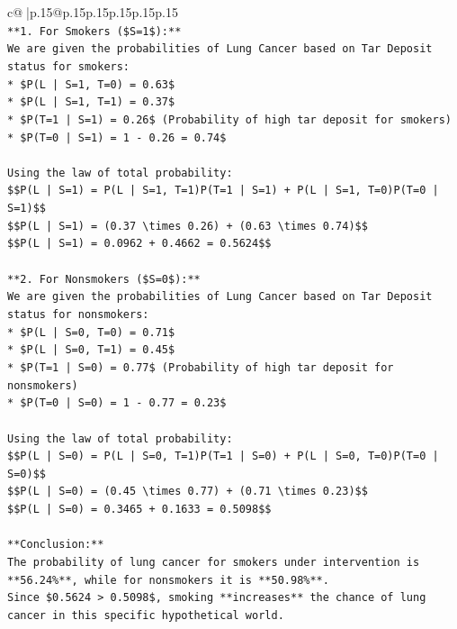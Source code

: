 \documentclass{article}
\begin{document}
{\begin{supertabular}{c@{$\;$}|p{.15\linewidth}@{}p{.15\linewidth}p{.15\linewidth}p{.15\linewidth}p{.15\linewidth}p{.15\linewidth}}
{{{\\ 
\texttt{**1. For Smokers (\$S=1\$):**} \\
\texttt{We are given the probabilities of Lung Cancer based on Tar Deposit status for smokers:} \\
\texttt{*   \$P(L | S=1, T=0) = 0.63\$} \\
\texttt{*   \$P(L | S=1, T=1) = 0.37\$} \\
\texttt{*   \$P(T=1 | S=1) = 0.26\$ (Probability of high tar deposit for smokers)} \\
\texttt{*   \$P(T=0 | S=1) = 1 {-} 0.26 = 0.74\$} \\
\\ 
\texttt{Using the law of total probability:} \\
\texttt{\$\$P(L | S=1) = P(L | S=1, T=1)P(T=1 | S=1) + P(L | S=1, T=0)P(T=0 | S=1)\$\$} \\
\texttt{\$\$P(L | S=1) = (0.37 \textbackslash{}times 0.26) + (0.63 \textbackslash{}times 0.74)\$\$} \\
\texttt{\$\$P(L | S=1) = 0.0962 + 0.4662 = 0.5624\$\$} \\
\\ 
\texttt{**2. For Nonsmokers (\$S=0\$):**} \\
\texttt{We are given the probabilities of Lung Cancer based on Tar Deposit status for nonsmokers:} \\
\texttt{*   \$P(L | S=0, T=0) = 0.71\$} \\
\texttt{*   \$P(L | S=0, T=1) = 0.45\$} \\
\texttt{*   \$P(T=1 | S=0) = 0.77\$ (Probability of high tar deposit for nonsmokers)} \\
\texttt{*   \$P(T=0 | S=0) = 1 {-} 0.77 = 0.23\$} \\
\\ 
\texttt{Using the law of total probability:} \\
\texttt{\$\$P(L | S=0) = P(L | S=0, T=1)P(T=1 | S=0) + P(L | S=0, T=0)P(T=0 | S=0)\$\$} \\
\texttt{\$\$P(L | S=0) = (0.45 \textbackslash{}times 0.77) + (0.71 \textbackslash{}times 0.23)\$\$} \\
\texttt{\$\$P(L | S=0) = 0.3465 + 0.1633 = 0.5098\$\$} \\
\\ 
\texttt{**Conclusion:**} \\
\texttt{The probability of lung cancer for smokers under intervention is **56.24\%**, while for nonsmokers it is **50.98\%**.} \\
\texttt{Since \$0.5624 > 0.5098\$, smoking **increases** the chance of lung cancer in this specific hypothetical world.} \\
}}}
\end{supertabular}}
\end{document}
